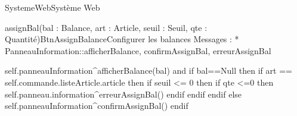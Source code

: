 \begin{OM}{SystemeWeb}{Système Web}
\begin{OMOperation}{assignBal(bal : Balance, art : Article, seuil : Seuil, qte : Quantité)}{BtnAssignBalance}{Configurer les balances}
Messages :
* PanneauInformation::{afficherBalance, confirmAssignBal, erreurAssignBal}
\begin{OMPre}
\end{OMPre}
\begin{OMPost}
        self.panneauInformation^afficherBalance(bal)
        and
        if bal==Null then
                if art == self.commande.listeArticle.article then
                        if seuil <= 0 then
                                if qte <=0 then
                                        self.panneau.information^erreurAssignBal()
                                endif
                        endif
                endif
        else
                self.panneauInformation^confirmAssignBal()
        endif
            \end{OMPost}
\end{OMOperation}
\end{OM}
